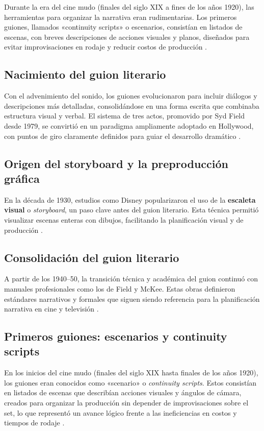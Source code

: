 \documentclass[12pt]{article}
\begin{document}
	Durante la era del cine mudo (finales del siglo XIX a fines de los años 1920), las herramientas para organizar la narrativa eran rudimentarias. Los primeros guiones, llamados «continuity scripts» o escenarios, consistían en listados de escenas, con breves descripciones de acciones visuales y planos, diseñados para evitar improvisaciones en rodaje y reducir costos de producción \parencite{screenplayology_history}.

	\subsection{Nacimiento del guion literario}

	Con el advenimiento del sonido, los guiones evolucionaron para incluir diálogos y descripciones más detalladas, consolidándose en una forma escrita que combinaba estructura visual y verbal. El sistema de tres actos, promovido por Syd Field desde 1979, se convirtió en un paradigma ampliamente adoptado en Hollywood, con puntos de giro claramente definidos para guiar el desarrollo dramático \parencite{newyorker_mckee,newyorker_mckee2}.

	\subsection{Origen del storyboard y la preproducción gráfica}

	En la década de 1930, estudios como Disney popularizaron el uso de la \textbf{escaleta visual} o \textit{storyboard}, un paso clave antes del guion literario. Esta técnica permitió visualizar escenas enteras con dibujos, facilitando la planificación visual y de producción \parencite{storyboard_wikipedia}.

	\subsection{Consolidación del guion literario}

	A partir de los 1940--50, la transición técnica y académica del guion continuó con manuales profesionales como los de Field y McKee. Estas obras definieron estándares narrativos y formales que siguen siendo referencia para la planificación narrativa en cine y televisión \parencite{screenplayology_history,newyorker_mckee}.

	\subsection{Primeros guiones: escenarios y continuity scripts}
	En los inicios del cine mudo (finales del siglo XIX hasta finales de los años 1920), los guiones eran conocidos como «scenario» o \textit{continuity scripts}. Estos consistían en listados de escenas que describían acciones visuales y ángulos de cámara, creados para organizar la producción sin depender de improvisaciones sobre el set, lo que representó un avance lógico frente a las ineficiencias en costos y tiempos de rodaje \parencite{thescriptlab_history,screenplayology_history,wcftr_continuity}.
\end{document}
